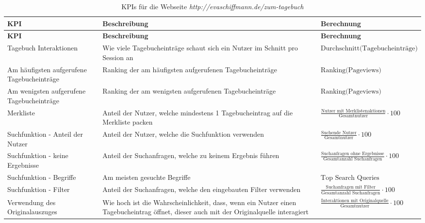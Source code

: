 \renewcommand{\arraystretch}{1.5} 
\begin{xltabular}{\textwidth}{|X|X|X|}
    \caption{KPIs für die Webseite \textit{http://evaschiffmann.de/zum-tagebuch}} \label{tab:kpi_tagebuch} \\
    \hline
    \textbf{KPI} & \textbf{Beschreibung} & \textbf{Berechnung} \\ \hline
    \endfirsthead

    \hline
    \textbf{KPI} & \textbf{Beschreibung} & \textbf{Berechnung} \\ \hline
    \endhead

    \hline
    \endfoot

    \hline
    \endlastfoot

    Tagebuch Interaktionen & Wie viele Tagebucheinträge schaut sich ein Nutzer im Schnitt pro Session an & {\footnotesize \(\text{Durchschnitt(Tagebucheinträge)}\)} \\ \hline
    Am häufigsten aufgerufene Tagebucheinträge & Ranking der am häufigsten aufgerufenen Tagebucheinträge & {\footnotesize \(\text{Ranking(Pageviews)}\)} \\ \hline
    Am wenigsten aufgerufene Tagebucheinträge & Ranking der am wenigsten aufgerufenen Tagebucheinträge & {\footnotesize \(\text{Ranking(Pageviews)}\)} \\ \hline
    Merkliste & Anteil der Nutzer, welche mindestens 1 Tagebucheintrag auf die Merkliste packen & {\footnotesize \(\frac{\text{Nutzer mit Merklistenaktionen}}{\text{Gesamtnutzer}} \cdot 100\)} \\ \hline
    Suchfunktion - Anteil der Nutzer & Anteil der Nutzer, welche die Suchfunktion verwenden & {\footnotesize \(\frac{\text{Suchende Nutzer}}{\text{Gesamtnutzer}} \cdot 100\)} \\ \hline
    Suchfunktion - keine Ergebnisse & Anteil der Suchanfragen, welche zu keinem Ergebnis führen & {\footnotesize \(\frac{\text{Suchanfragen ohne Ergebnisse}}{\text{Gesamtanzahl Suchanfragen}} \cdot 100\)} \\ \hline
    Suchfunktion - Begriffe & Am meisten gesuchte Begriffe & {\footnotesize \(\text{Top Search Queries}\)} \\ \hline
    Suchfunktion - Filter & Anteil der Suchanfragen, welche den eingebauten Filter verwenden & {\footnotesize \(\frac{\text{Suchanfragen mit Filter}}{\text{Gesamtanzahl Suchanfragen}} \cdot 100\)} \\ \hline
    Verwendung des Originalauszuges & Wie hoch ist die Wahrscheinlichkeit, dass, wenn ein Nutzer einen Tagebucheintrag öffnet, dieser auch mit der Originalquelle interagiert & {\footnotesize \(\frac{\text{Interaktionen mit Originalquelle}}{\text{Gesamtnutzer}} \cdot 100\)} \\ \hline
\end{xltabular}

